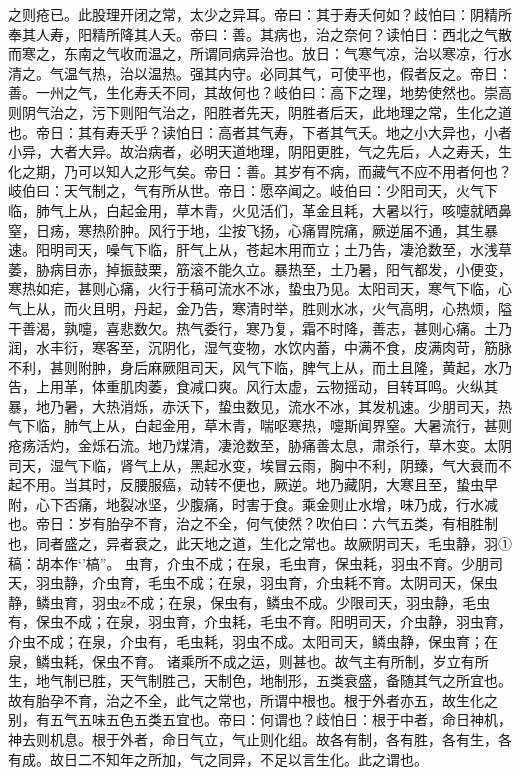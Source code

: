 \documentclass[a4paper,12pt,UTF8,twoside]{ctexbook}
\begin{document}
之则疮已。此股理开闭之常，太少之异耳。帝曰：其于寿夭何如？歧怕曰：阴精所奉其人寿，阳精所降其人夭。帝曰：善。其病也，治之奈何？读怕日：西北之气散而寒之，东南之气收而温之，所谓同病异治也。放日：气寒气凉，治以寒凉，行水清之。气温气热，治以温热。强其内守。必同其气，可使平也，假者反之。帝日：善。一州之气，生化寿夭不同，其故何也？岐伯曰：高下之理，地势使然也。崇高则阴气治之，污下则阳气治之，阳胜者先天，阴胜者后天，此地理之常，生化之道也。帝日：其有寿夭乎？读怕日：高者其气寿，下者其气夭。地之小大异也，小者小异，大者大异。故治病者，必明天道地理，阴阳更胜，气之先后，人之寿夭，生化之期，乃可以知人之形气矣。帝日：善。其岁有不病，而藏气不应不用者何也？岐伯曰：天气制之，气有所从世。帝日：愿卒闻之。岐伯曰：少阳司天，火气下临，肺气上从，白起金用，草木青，火见活们，革金且耗，大暑以行，咳嚏就晒鼻窒，日疡，寒热阶肿。风行于地，尘按飞扬，心痛胃院痛，厥逆届不通，其生暴速。阳明司天，噪气下临，肝气上从，苍起木用而立；土乃告，凄沧数至，水浅草萎，胁病目赤，掉振鼓栗，筋滚不能久立。暴热至，土乃暑，阳气都发，小便变，寒热如疟，甚则心痛，火行于稿可流水不冰，蛰虫乃见。太阳司天，寒气下临，心气上从，而火且明，丹起，金乃告，寒清时举，胜则水冰，火气高明，心热烦，隘干善渴，孰嚏，喜悲数欠。热气委行，寒乃复，霜不时降，善志，甚则心痛。土乃润，水丰衍，寒客至，沉阴化，湿气变物，水饮内蓄，中满不食，皮满肉苛，筋脉不利，甚则附肿，身后麻厥阻司天，风气下临，脾气上从，而土且隆，黄起，水乃告，上用革，体重肌肉萎，食减口爽。风行太虚，云物摇动，目转耳鸣。火纵其暴，地乃暑，大热消烁，赤沃下，蛰虫数见，流水不冰，其发机速。少朋司天，热气下临，肺气上从，白起金用，草木青，喘呕寒热，嚏斯闻界窒。大暑流行，甚则疮疡活灼，金烁石流。地乃煤清，凄沧数至，胁痛善太息，肃杀行，草木变。太阴司天，湿气下临，肾气上从，黑起水变，埃冒云雨，胸中不利，阴臻，气大衰而不起不用。当其时，反腰服癌，动转不便也，厥逆。地乃藏阴，大寒且至，蛰虫早附，心下否痛，地裂冰坚，少腹痛，时害于食。乘金则止水增，味乃成，行水减也。帝日：岁有胎孕不育，治之不全，何气使然？吹伯曰：六气五类，有相胜制也，同者盛之，异者衰之，此天地之道，生化之常也。故厥阴司天，毛虫静，羽①稿：胡本作‘’槁”。
虫育，介虫不成；在泉，毛虫育，保虫耗，羽虫不育。少朋司天，羽虫静，介虫育，毛虫不成；在泉，羽虫育，介虫耗不育。太阴司天，保虫静，鳞虫育，羽虫z不成；在泉，保虫有，鳞虫不成。少限司天，羽虫静，毛虫有，保虫不成；在泉，羽虫育，介虫耗，毛虫不育。阳明司天，介虫静，羽虫育，介虫不成；在泉，介虫有，毛虫耗，羽虫不成。太阳司天，鳞虫静，保虫育；在泉，鳞虫耗，保虫不育。
诸乘所不成之运，则甚也。故气主有所制，岁立有所生，地气制已胜，天气制胜己，天制色，地制形，五类衰盛，备随其气之所宜也。故有胎孕不育，治之不全，此气之常也，所谓中根也。根于外者亦五，故生化之别，有五气五味五色五类五宜也。帝曰：何谓也？歧怕日：根于中者，命日神机，神去则机息。根于外者，命日气立，气止则化组。故各有制，各有胜，各有生，各有成。故日二不知年之所加，气之同异，不足以言生化。此之谓也。
\end{document}
